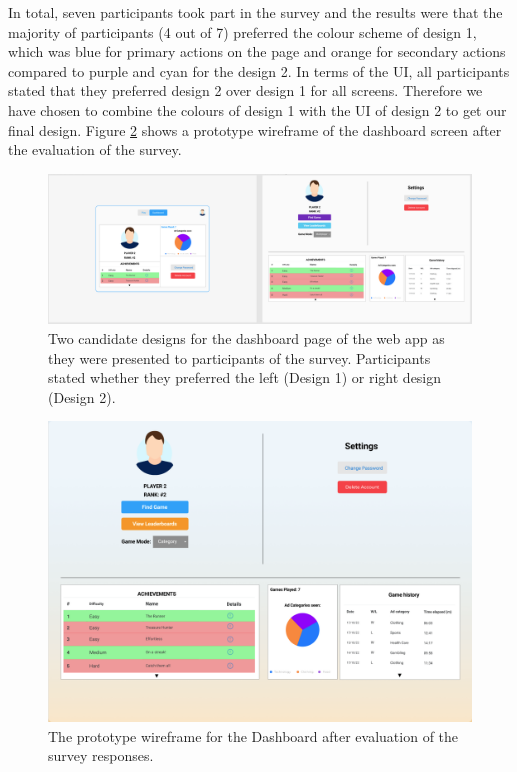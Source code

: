 \documentclass{l4proj}
\begin{document}
In total, seven participants took part in the survey and the results were that the majority of participants (4 out of 7) preferred the colour scheme of design 1, which was blue for primary actions on the page and orange for secondary actions compared to purple and cyan for the design 2. In terms of the UI, all participants stated that they preferred design 2 over design 1 for all screens. Therefore we have chosen to combine the colours of design 1 with the UI of design 2 to get our final design. Figure \ref{fig:finaldesign} shows a prototype wireframe of the dashboard screen after the evaluation of the survey.
\begin{figure}
    \centering
    \includegraphics[width=1\linewidth]{images/Dashboard.png}    

    \caption{Two candidate designs for the dashboard page of the web app as they were presented to participants of the survey. Participants stated whether they preferred the left (Design 1) or right design (Design 2). }

    \label{fig:wireframe} 
\end{figure}

\begin{figure}
    \centering
    \includegraphics[width=1\linewidth]{images/DashboardFinal.png}    

    \caption{The prototype wireframe for the Dashboard after evaluation of the survey responses. }

    \label{fig:finaldesign} 
\end{figure}
\end{document}

